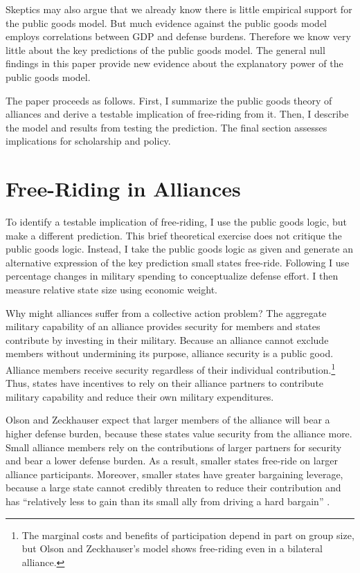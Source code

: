 \documentclass[12pt]{article}
\begin{document}
Skeptics may also argue that we already know there is little empirical support for the public goods model. 
But much evidence against the public goods model employs correlations between GDP and defense burdens. 
Therefore we know very little about the key predictions of the public goods model. 
The general null findings in this paper provide new evidence about the explanatory power of the public goods model. 


The paper proceeds as follows.
First, I summarize the public goods theory of alliances and derive a testable implication of free-riding from it.
Then, I describe the model and results from testing the prediction. 
The final section assesses implications for scholarship and policy. 



\section{Free-Riding in Alliances}

To identify a testable implication of free-riding, I use the public goods logic, but make a different prediction.
This brief theoretical exercise does not critique the public goods logic.
Instead, I take the public goods logic as given and generate an alternative expression of the key prediction small states free-ride. 
Following \citet{PluemperNeumayer2015} I use percentage changes in military spending to conceptualize defense effort.
I then measure relative state size using economic weight. 


Why might alliances suffer from a collective action problem?
The aggregate military capability of an alliance provides security for members and states contribute by investing in their military.
Because an alliance cannot exclude members without undermining its purpose, alliance security is a public good. 
Alliance members receive security regardless of their individual contribution.\footnote{The marginal costs and benefits of participation depend in part on group size, but Olson and Zeckhauser's model shows free-riding even in a bilateral alliance.}
Thus, states have incentives to rely on their alliance partners to contribute military capability and reduce their own military expenditures.  

 
Olson and Zeckhauser expect that larger members of the alliance will bear a higher defense burden, because these states value security from the alliance more.
Small alliance members rely on the contributions of larger partners for security and bear a lower defense burden.
As a result, smaller states free-ride on larger alliance participants. 
Moreover, smaller states have greater bargaining leverage, because a large state cannot credibly threaten to reduce their contribution and has ``relatively less to gain than its small ally from driving a hard bargain'' \citep[pg. 274]{OlsonZeckhauser1966}. 
\end{document}
